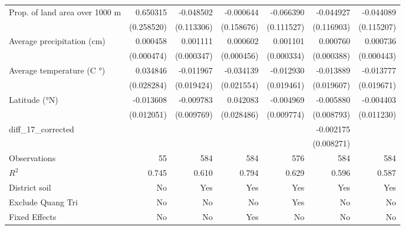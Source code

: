 \begin{table}[htbp]
\begin{tabular}{l*{6}{D{.}{.}{-1}}}
\addlinespace
Prop. of land area over 1000 m&    0.650315\sym{**} &   -0.048502         &   -0.000644         &   -0.066390         &   -0.044927         &   -0.044089         \\
                    &  (0.258520)         &  (0.113306)         &  (0.158676)         &  (0.111527)         &  (0.116903)         &  (0.115207)         \\
\addlinespace
Average precipitation (cm)&    0.000458         &    0.001111\sym{***}&    0.000602         &    0.001101\sym{***}&    0.000760\sym{*}  &    0.000736         \\
                    &  (0.000474)         &  (0.000347)         &  (0.000456)         &  (0.000334)         &  (0.000388)         &  (0.000443)         \\
\addlinespace
Average temperature (C $°$)&    0.034846         &   -0.011967         &   -0.034139         &   -0.012930         &   -0.013889         &   -0.013777         \\
                    &  (0.028284)         &  (0.019424)         &  (0.021554)         &  (0.019461)         &  (0.019607)         &  (0.019671)         \\
\addlinespace
Latitude (°N)       &   -0.013608         &   -0.009783         &    0.042083         &   -0.004969         &   -0.005880         &   -0.004403         \\
                    &  (0.012051)         &  (0.009769)         &  (0.028486)         &  (0.009774)         &  (0.008793)         &  (0.011230)         \\
\addlinespace
diff\_17\_corrected   &                     &                     &                     &                     &   -0.002175         &                     \\
                    &                     &                     &                     &                     &  (0.008271)         &                     \\
\midrule
Observations        &          55         &         584         &         584         &         576         &         584         &         584         \\
\(R^{2}\)           &       0.745         &       0.610         &       0.794         &       0.629         &       0.596         &       0.587         \\
District soil       &          No         &         Yes         &         Yes         &         Yes         &         Yes         &         Yes         \\
Exclude Quang Tri   &          No         &          No         &          No         &         Yes         &          No         &          No         \\
Fixed Effects       &          No         &          No         &         Yes         &          No         &          No         &          No         \\
\bottomrule
\end{tabular}
\end{table}
